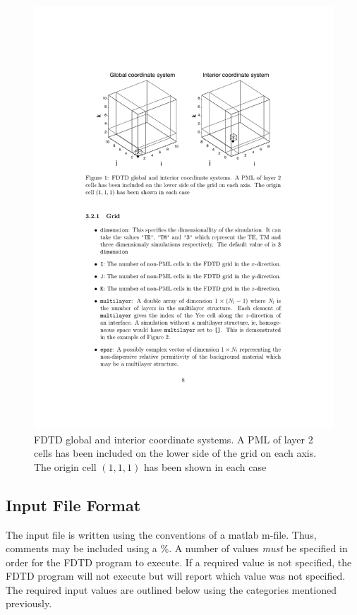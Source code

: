 \documentclass[a4paper, 12pt]{article}
\begin{document}
	\begin{figure}[h]
		\begin{center}
			\includegraphics[width=\textwidth]{figures/0.pdf}
			\caption{FDTD global and interior coordinate systems. A PML of layer 2
				cells has been included on the lower side of the grid on each
				axis. The origin cell $(1,1,1)$ has been shown in each case}
			\label{fig:coords}
		\end{center}
	\end{figure}
	
	
	\subsection{Input File Format}
	The input file is written using the conventions of a matlab
	m-file. Thus, comments may be included using a \%. A number of values
	\emph{must} be specified in order for the FDTD program to execute. If a
	required value is not specified, the FDTD program will not execute but
	will report which value was not specified. The required input values
	are outlined below using the categories mentioned previously.
	
\end{document}
